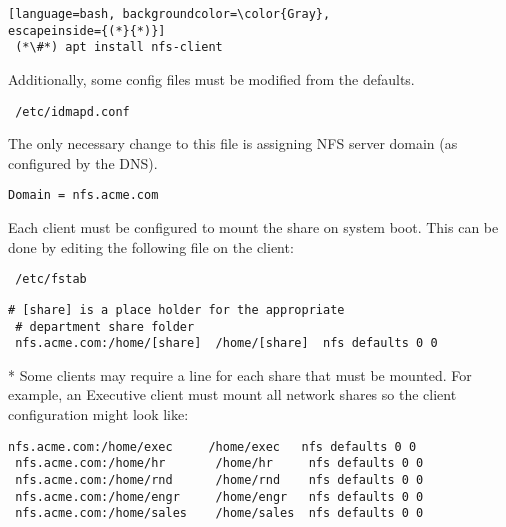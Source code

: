 \begin{lstlisting}[language=bash, backgroundcolor=\color{Gray}, 
escapeinside={(*}{*)}]
 (*\#*) apt install nfs-client
\end{lstlisting}
\vspace{1em}

\noindent
Additionally, some config files must be modified from the defaults. \\

\begin{lstlisting}
 /etc/idmapd.conf
\end{lstlisting}
\vspace{1em}

\noindent
The only necessary change to this file is assigning NFS server domain (as
configured by the DNS). \\

\begin{lstlisting}[backgroundcolor=\color{Gray}]
 Domain = nfs.acme.com
\end{lstlisting}
\vspace{1em}

\noindent
Each client must be configured to mount the share on system boot. This can be
done by editing the following file on the client: \\
\begin{lstlisting}
 /etc/fstab
\end{lstlisting}
\vspace{1em}

\begin{lstlisting}[backgroundcolor=\color{Gray}]
 # [share] is a place holder for the appropriate 
 # department share folder
 nfs.acme.com:/home/[share]  /home/[share]  nfs defaults 0 0
\end{lstlisting}
* Some clients may require a line for each share that must be mounted. For
example, an Executive client must mount all network shares so the client 
configuration might look like: \\

\begin{lstlisting}[backgroundcolor=\color{Gray}]
 nfs.acme.com:/home/exec     /home/exec   nfs defaults 0 0
 nfs.acme.com:/home/hr       /home/hr     nfs defaults 0 0
 nfs.acme.com:/home/rnd      /home/rnd    nfs defaults 0 0
 nfs.acme.com:/home/engr     /home/engr   nfs defaults 0 0
 nfs.acme.com:/home/sales    /home/sales  nfs defaults 0 0
\end{lstlisting}
\vspace{1em}

